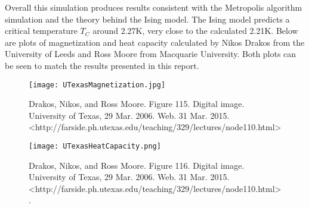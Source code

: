 \documentclass[10pt,letterpaper]{article}
\begin{document}
Overall this simulation produces results consistent with the Metropolis algorithm simulation and the theory behind the Ising model. The Ising model predicts a critical temperature $T_{C}$ around 2.27K, very close to the calculated 2.21K. Below are plots of magnetization and heat capacity calculated by Nikos Drakos from the University of Leeds and Ross Moore from Macquarie University. Both plots can be seen to match the results presented in this report.

\begin{figure}[H]
\centering
\texttt{[image: UTexasMagnetization.jpg]}
\caption{Drakos, Nikos, and Ross Moore. Figure 115. Digital image. University of Texas, 29 Mar. 2006. Web. 31 Mar. 2015. <http://farside.ph.utexas.edu/teaching/329/lectures/node110.html>}
\end{figure}

\begin{figure}[H]
\centering
\texttt{[image: UTexasHeatCapacity.png]}
\caption{Drakos, Nikos, and Ross Moore. Figure 116. Digital image. University of Texas, 29 Mar. 2006. Web. 31 Mar. 2015. <http://farside.ph.utexas.edu/teaching/329/lectures/node110.html>.}
\end{figure}
\end{document}
